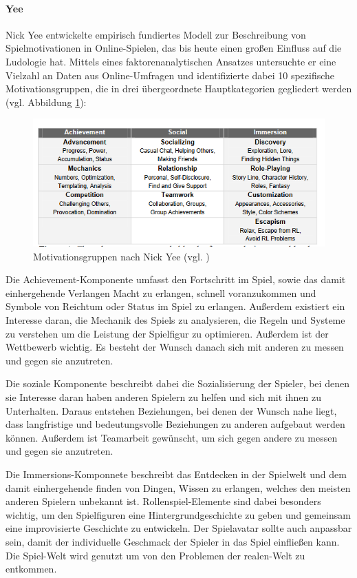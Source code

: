 \paragraph{Yee}
Nick Yee entwickelte empirisch fundiertes Modell zur Beschreibung von Spielmotivationen in Online-Spielen, das bis heute einen großen Einfluss auf die Ludologie hat. Mittels eines faktorenanalytischen Ansatzes untersuchte er eine Vielzahl an Daten aus Online-Umfragen und identifizierte dabei 10 spezifische Motivationsgruppen, die in drei übergeordnete Hauptkategorien gegliedert werden (vgl. Abbildung \ref{fig:nick_yee_motivations}):

\begin{figure}[ht]
\centering
\includegraphics[width=1\linewidth]{content/pictures/nick_yee_categorizations.PNG}
\caption{Motivationsgruppen nach Nick Yee (vgl. \cite{yee_motivations_nodate})}
\label{fig:nick_yee_motivations}
\end{figure}

Die Achievement-Komponente umfasst den Fortschritt im Spiel, sowie das damit einhergehende Verlangen Macht zu erlangen, schnell voranzukommen und Symbole von Reichtum oder Status im Spiel zu erlangen. Außerdem existiert ein Interesse daran, die Mechanik des Spiels zu analysieren, die Regeln und Systeme zu verstehen um die Leistung der Spielfigur zu optimieren. Außerdem ist der Wettbewerb wichtig. Es besteht der Wunsch danach sich mit anderen zu messen und gegen sie anzutreten.

Die soziale Komponente beschreibt dabei die Sozialisierung der Spieler, bei denen sie Interesse daran haben anderen Spielern zu helfen und sich mit ihnen zu Unterhalten. Daraus entstehen Beziehungen, bei denen der Wunsch nahe liegt, dass langfristige und bedeutungsvolle Beziehungen zu anderen aufgebaut werden können. Außerdem ist Teamarbeit gewünscht, um sich gegen andere zu messen und gegen sie anzutreten.

Die Immersions-Komponnete beschreibt das Entdecken in der Spielwelt und dem damit einhergehende finden von Dingen, Wissen zu erlangen, welches den meisten anderen Spielern unbekannt ist. Rollenspiel-Elemente sind dabei besonders wichtig, um den Spielfiguren eine Hintergrundgeschichte zu geben und gemeinsam eine improvisierte Geschichte zu entwickeln. Der Spielavatar sollte auch anpassbar sein, damit der individuelle Geschmack der Spieler in das Spiel einfließen kann. Die Spiel-Welt wird genutzt um von den Problemen der realen-Welt zu entkommen.

